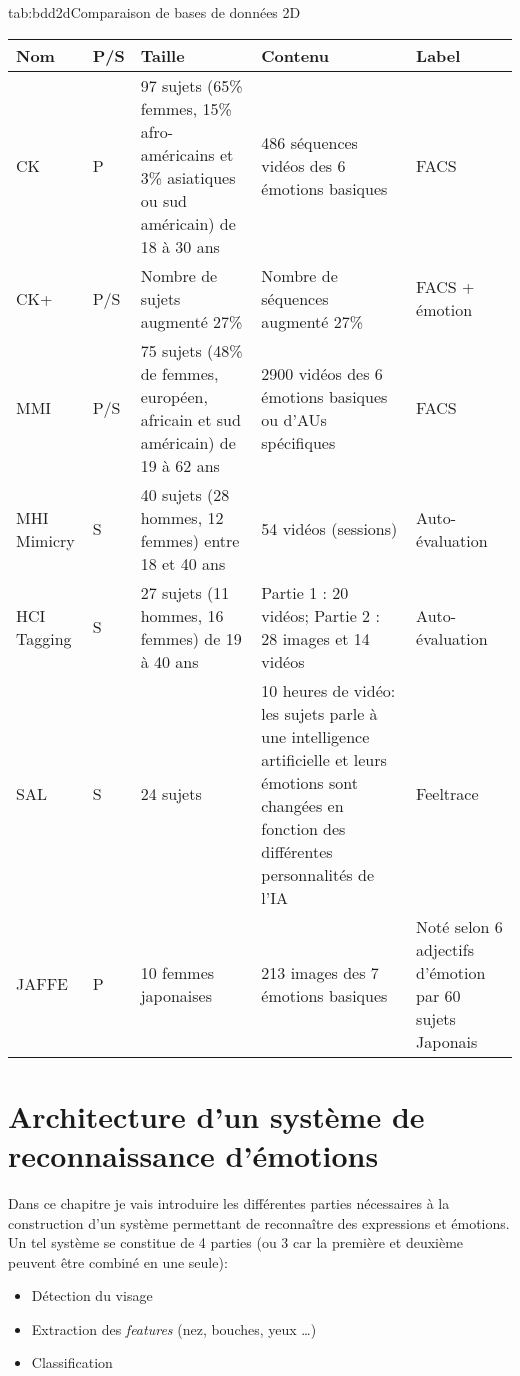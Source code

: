 \documentclass[overfullbox, poster]{polytech/polytech}
\begin{document}
\begin{Table}{tab:bdd2d}{Comparaison de bases de données 2D}
	\begin{tabular}{|p{1.5cm}|p{0.7cm}|p{4cm}|p{5cm}|p{2.5cm}|}
		\hline
		\textbf{Nom} &\textbf{P/S} &\textbf{Taille} &\textbf{Contenu} &\textbf{Label}\\\hline
		CK\cite{ck} &P & 97 sujets (65\% femmes, 15\% afro-américains et 3\% asiatiques ou sud américain) de 18 à 30 ans &486 séquences vidéos des 6 émotions basiques & FACS\\
		CK+\cite{ckplus} &P/S &Nombre de sujets augmenté 27\% &Nombre de séquences augmenté 27\% &FACS + émotion\\
		MMI\cite{mmi1} \cite{mmi2} &P/S &75 sujets (48\% de femmes, européen, africain et sud américain) de 19 à 62 ans &2900 vidéos des 6 émotions basiques ou d'AUs spécifiques &FACS\\
		MHI Mimicry \cite{mimicry1}\cite{mimicry2} &S & 40 sujets (28 hommes, 12 femmes) entre 18 et 40 ans &54 vidéos (sessions) &Auto-évaluation\\
		HCI Tagging \cite{tagging1}\cite{tagging2} &S &27 sujets (11 hommes, 16 femmes) de 19 à 40 ans &Partie 1 : 20 vidéos; Partie 2 : 28 images et 14 vidéos &Auto-évaluation\\
		SAL \cite{sal} &S &24 sujets &10 heures de vidéo: les sujets parle à une intelligence artificielle et leurs émotions sont changées en fonction des différentes personnalités de l'IA &Feeltrace\\
		JAFFE\cite{jaffe} &P &10 femmes japonaises &213 images des 7 émotions basiques &Noté selon 6 adjectifs d'émotion par 60 sujets Japonais\\
		\hline
	\end{tabular}
\end{Table}

\chapter{Architecture d'un système de reconnaissance d'émotions}
Dans ce chapitre je vais introduire les différentes parties nécessaires à la construction d'un système permettant de reconnaître des expressions et émotions.\\
Un tel système se constitue de 4 parties (ou 3 car la première et deuxième peuvent être combiné en une seule):
\begin{itemize}
\item Détection du visage
\item Extraction des \textit{features} (nez, bouches, yeux …)
\item Classification\\
\end{itemize}
\end{document}

